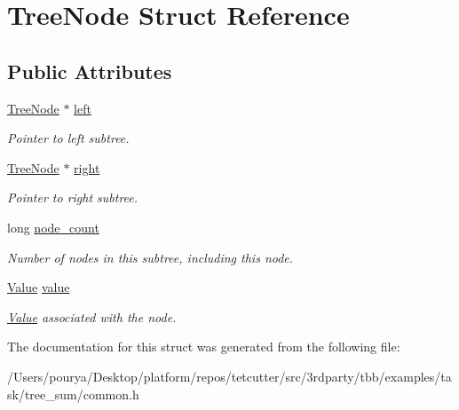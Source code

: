 \hypertarget{structTreeNode}{}\section{Tree\+Node Struct Reference}
\label{structTreeNode}
\subsection*{Public Attributes}
\begin{DoxyCompactItemize}
\item 
\hypertarget{structTreeNode_a5335e7d975822e87088ec2afdefb1736}{}\hyperlink{structTreeNode}{Tree\+Node} $\ast$ \hyperlink{structTreeNode_a5335e7d975822e87088ec2afdefb1736}{left}\label{structTreeNode_a5335e7d975822e87088ec2afdefb1736}

\begin{DoxyCompactList}\small\item\em Pointer to left subtree. \end{DoxyCompactList}\item 
\hypertarget{structTreeNode_a71b4faa364404d671943562b352b1b74}{}\hyperlink{structTreeNode}{Tree\+Node} $\ast$ \hyperlink{structTreeNode_a71b4faa364404d671943562b352b1b74}{right}\label{structTreeNode_a71b4faa364404d671943562b352b1b74}

\begin{DoxyCompactList}\small\item\em Pointer to right subtree. \end{DoxyCompactList}\item 
\hypertarget{structTreeNode_a95e66468412daa6632d58c88baef55c6}{}long \hyperlink{structTreeNode_a95e66468412daa6632d58c88baef55c6}{node\+\_\+count}\label{structTreeNode_a95e66468412daa6632d58c88baef55c6}

\begin{DoxyCompactList}\small\item\em Number of nodes in this subtree, including this node. \end{DoxyCompactList}\item 
\hypertarget{structTreeNode_ab4264c5bfe002bb8a41f2888e8e40ddd}{}\hyperlink{structValue}{Value} \hyperlink{structTreeNode_ab4264c5bfe002bb8a41f2888e8e40ddd}{value}\label{structTreeNode_ab4264c5bfe002bb8a41f2888e8e40ddd}

\begin{DoxyCompactList}\small\item\em \hyperlink{structValue}{Value} associated with the node. \end{DoxyCompactList}\end{DoxyCompactItemize}


The documentation for this struct was generated from the following file\+:\begin{DoxyCompactItemize}
\item 
/\+Users/pourya/\+Desktop/platform/repos/tetcutter/src/3rdparty/tbb/examples/task/tree\+\_\+sum/common.\+h\end{DoxyCompactItemize}
